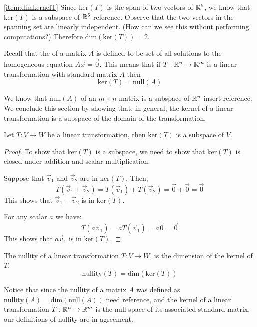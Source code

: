 \documentclass{ximera}
\begin{document}
\begin{example}
\begin{explanation}
\ref{item:dimkernelT}  Since $\text{ker}(T)$ is the span of two vectors of $\mathbb{R}^5$, we know that $\text{ker}(T)$ is a subspace of $\mathbb{R}^5$ {\color{red} reference}.  Observe that the two vectors in the spanning set are linearly independent. (How can we see this without performing computations?)  Therefore $\text{dim}(\text{ker}(T))=2$.
\end{explanation}
\end{example}

\begin{general}
Recall that the  of a matrix $A$ is defined to be set of all solutions to the homogeneous equation $A\vec{x}=\vec{0}$. This means that  if $T:\mathbb{R}^n\rightarrow \mathbb{R}^m$ is a linear transformation with standard matrix $A$ then
$$\text{ker}(T)=\text{null}(A)$$
\end{general}
We know that $\text{null}(A)$ of an $m\times n$ matrix is a subspace of $\mathbb{R}^n$ {\color{red} insert reference}.  We conclude this section by showing that, in general, the kernel of a linear transformation is a subspace of the domain of the transformation.
\begin{theorem}\label{th:kersubspace} Let $T:V\rightarrow W$ be a linear transformation, then $\text{ker}(T)$ is a subspace of $V$.
\end{theorem}
\begin{proof}
To show that $\text{ker}(T)$ is a subspace, we need to show that $\text{ker}(T)$ is closed under addition and scalar multiplication.

Suppose that $\vec{v}_1$ and $\vec{v}_2$ are in $\text{ker}(T)$.  Then,
$$T(\vec{v}_1+\vec{v}_2)=T(\vec{v}_1)+T(\vec{v}_2)=\vec{0}+\vec{0}=\vec{0}$$
This shows that $\vec{v}_1+\vec{v}_2$ is in $\text{ker}(T)$.

For any scalar $a$ we have:
$$T(a\vec{v}_1)=aT(\vec{v}_1)=a\vec{0}=\vec{0}$$
This shows that $a\vec{v}_1$ is in $\text{ker}(T)$.

\end{proof}



\begin{definition}\label{def:nullityT}
The nullity of a linear transformation $T:V\rightarrow W$, is the dimension of the kernel of $T$.
$$\text{nullity}(T)=\text{dim}(\text{ker}(T))$$
\end{definition}

Notice that since the nullity of a matrix $A$ was defined as $\text{nullity}(A) = \text{dim}(\text{null}(A))$ {\color{red} need reference}, and the kernel of a linear transformation $T:\mathbb{R}^n\rightarrow \mathbb{R}^m$ is the null space of its associated standard matrix, our definitions of nullity are in agreement.
\end{document}

